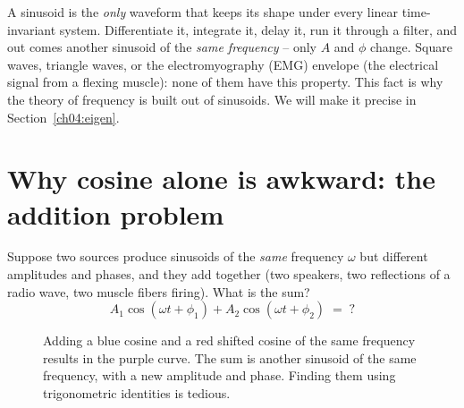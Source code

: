 \begin{intuitionbox}
A sinusoid is the \emph{only} waveform that keeps its shape under every linear time-invariant system.
Differentiate it, integrate it, delay it, run it through a filter, and out
comes another sinusoid of the \emph{same frequency} -- only $A$ and $\phi$ change. Square waves, triangle waves, or the electromyography (EMG) envelope (the electrical signal from a flexing muscle): none of them have this property. This fact is why
the theory of frequency is built out of sinusoids. We will make it precise
in Section~\ref{ch04:eigen}.
\end{intuitionbox}

\section{Why cosine alone is awkward: the addition problem}
\label{ch04:addition}

Suppose two sources produce sinusoids of the \emph{same} frequency $\omega$ but different amplitudes and phases, and they add
together (two speakers, two reflections of a radio wave, two muscle fibers firing). What is the
sum?
\[
  A_1\cos(\omega t + \phi_1) + A_2\cos(\omega t + \phi_2) \;=\; ?
\]

\begin{figure}[htbp]
\centering
{}
\caption{Adding a blue cosine and a red shifted cosine of the same frequency results in the purple curve. The sum is another sinusoid of the same frequency, with a new amplitude and phase. Finding them using trigonometric identities is tedious.}
\label{ch04:fig-sum-cosines}
\end{figure}


